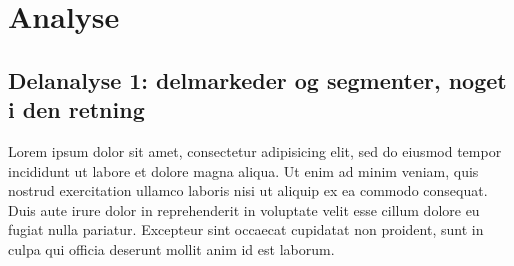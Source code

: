 
\part{Analyse\label{part_analyse}}


\chapter{Delanalyse 1: delmarkeder og segmenter, noget i den retning \label{analyse_deskriptivt}}

Lorem ipsum dolor sit amet, consectetur adipisicing elit, sed do eiusmod
tempor incididunt ut labore et dolore magna aliqua. Ut enim ad minim veniam,
quis nostrud exercitation ullamco laboris nisi ut aliquip ex ea commodo
consequat. Duis aute irure dolor in reprehenderit in voluptate velit esse
cillum dolore eu fugiat nulla pariatur. Excepteur sint occaecat cupidatat non
proident, sunt in culpa qui officia deserunt mollit anim id est laborum.

	
	




% 
% 
% 
% 
% 






